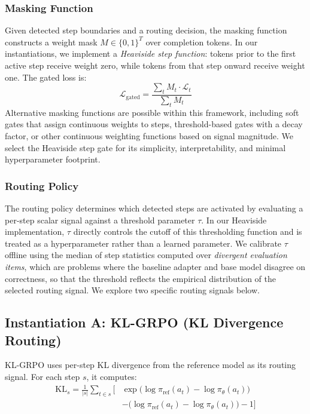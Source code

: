 \documentclass{article}
\begin{document}
\subsubsection{Masking Function}
Given detected step boundaries and a routing decision, the masking function constructs a weight mask $M \in \{0,1\}^T$ over completion tokens. In our instantiations, we implement a \emph{Heaviside step function}: tokens prior to the first active step receive weight zero, while tokens from that step onward receive weight one. The gated loss is:
\begin{equation}
\mathcal{L}_\text{gated} = \frac{\sum_t M_t \cdot \mathcal{L}_t}{\sum_t M_t}
\label{eq:gated_loss}
\end{equation}
Alternative masking functions are possible within this framework, including soft gates that assign continuous weights to steps, threshold-based gates with a decay factor, or other continuous weighting functions based on signal magnitude. We select the Heaviside step gate for its simplicity, interpretability, and minimal hyperparameter footprint.

\subsubsection{Routing Policy}
The routing policy determines which detected steps are activated by evaluating a per-step scalar signal against a threshold parameter $\tau$. In our Heaviside implementation, $\tau$ directly controls the cutoff of this thresholding function and is treated as a hyperparameter rather than a learned parameter. We calibrate $\tau$ offline using the median of step statistics computed over \emph{divergent evaluation items}, which are problems where the baseline adapter and base model disagree on correctness, so that the threshold reflects the empirical distribution of the selected routing signal. We explore two specific routing signals below.

\subsection{Instantiation A: KL-GRPO (KL Divergence Routing)}

KL-GRPO uses per-step KL divergence from the reference model as its routing signal. For each step $s$, it computes:
\begin{equation}
\begin{split}
\text{KL}_s = \frac{1}{|s|} \sum_{t \in s} \Big[ &\exp\!\bigl(\log\pi_\text{ref}(a_t) - \log\pi_\theta(a_t)\bigr) \\
&- \bigl(\log\pi_\text{ref}(a_t) - \log\pi_\theta(a_t)\bigr) - 1 \Big]
\end{split}
\label{eq:step_kl}
\end{equation}
\end{document}
